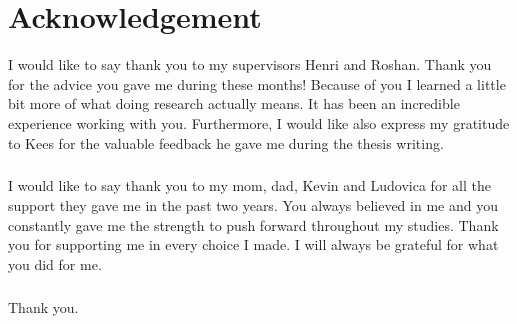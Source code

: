 \documentclass[12pt,twoside]{report}
\renewcommand{\chaptermark}[1]{\markboth{\thechapter.\ #1}{}}
\begin{document}
\clearpage{\pagestyle{empty}\cleardoublepage}

%

 


\printbibliography 
\clearpage{\pagestyle{empty}\cleardoublepage}
\chapter*{Acknowledgement}
I would like to say thank you to my supervisors Henri and Roshan. Thank you for the advice you gave me during these months! Because of you I learned a little bit more of what doing research actually means. It has been an incredible experience working with you. Furthermore, I would like also express my gratitude to Kees for the valuable feedback he gave me during the thesis writing.

\paragraph{}
I would like to say thank you to my mom, dad, Kevin and Ludovica for all the support they gave me in the past two years. You always believed in me and you constantly gave me the strength to push forward throughout my studies. Thank you for supporting me in every choice I made. I will always be grateful for what you did for me.

\paragraph{}
Thank you.
\end{document}
